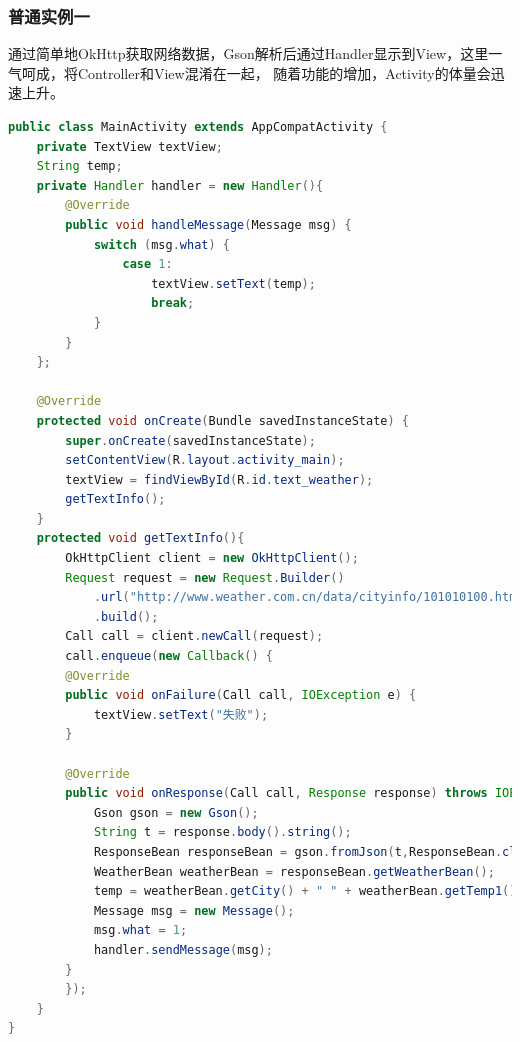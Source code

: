 \documentclass[a4paper,12pt]{ctexart}
\begin{document}
\subsubsection{普通实例一}
通过简单地OkHttp获取网络数据，Gson解析后通过Handler显示到View，这里一气呵成，将Controller和View混淆在一起，
随着功能的增加，Activity的体量会迅速上升。
\begin{lstlisting}[language=java]
public class MainActivity extends AppCompatActivity {
	private TextView textView;
	String temp;
	private Handler handler = new Handler(){
		@Override
		public void handleMessage(Message msg) {
			switch (msg.what) {
				case 1:
					textView.setText(temp);
					break;
			}
		}
	};
	
	@Override
	protected void onCreate(Bundle savedInstanceState) {
		super.onCreate(savedInstanceState);
		setContentView(R.layout.activity_main);
		textView = findViewById(R.id.text_weather);
		getTextInfo();
	}
	protected void getTextInfo(){
		OkHttpClient client = new OkHttpClient();
		Request request = new Request.Builder()
			.url("http://www.weather.com.cn/data/cityinfo/101010100.html")
			.build();
		Call call = client.newCall(request);
		call.enqueue(new Callback() {
		@Override
		public void onFailure(Call call, IOException e) {
			textView.setText("失败");
		}
		
		@Override
		public void onResponse(Call call, Response response) throws IOException {
			Gson gson = new Gson();
			String t = response.body().string();
			ResponseBean responseBean = gson.fromJson(t,ResponseBean.class);
			WeatherBean weatherBean = responseBean.getWeatherBean();
			temp = weatherBean.getCity() + " " + weatherBean.getTemp1() + " " + weatherBean.getTemp2() + " " + weatherBean.getWeather();
			Message msg = new Message();
			msg.what = 1;
			handler.sendMessage(msg);
		}
		});
	}
}
\end{lstlisting}
\end{document}
